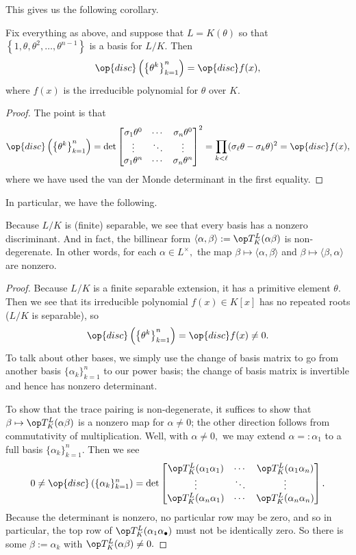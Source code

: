 This gives us the following corollary.
\begin{cor}
    Fix everything as above, and suppose that $L=K(\theta)$ so that $\left\{1,\theta,\theta^2,\ldots,\theta^{n-1}\right\}$ is a basis for $L/K.$ Then
    \[\op{disc}\left(\left\{\theta^k\right\}_{k=1}^n\right)=\op{disc}f(x),\]
    where $f(x)$ is the irreducible polynomial for $\theta$ over $K.$
\end{cor}
\begin{proof}
    The point is that
    \[\op{disc}\left(\left\{\theta^k\right\}_{k=1}^n\right)=\det\begin{bmatrix}
        \sigma_1\theta^0 & \cdots & \sigma_n\theta^0 \\
        \vdots & \ddots & \vdots \\
        \sigma_1\theta^n & \cdots & \sigma_n\theta^n
    \end{bmatrix}^2=\prod_{k<\ell}(\sigma_\ell\theta-\sigma_k\theta)^2=\op{disc}f(x),\]
    where we have used the van der Monde determinant in the first equality.
\end{proof}
In particular, we have the following.
\begin{thm}
    Because $L/K$ is (finite) separable, we see that every basis has a nonzero discriminant. And in fact, the billinear form $\langle\alpha,\beta\rangle:=\op T_K^L(\alpha\beta)$ is non-degerenate. In other words, for each $\alpha\in L^\times,$ the map $\beta\mapsto\langle\alpha,\beta\rangle$ and $\beta\mapsto\langle\beta,\alpha\rangle$ are nonzero.
\end{thm}
\begin{proof}
    Because $L/K$ is a finite separable extension, it has a primitive element $\theta.$ Then we see that its irreducible polynomial $f(x)\in K[x]$ has no repeated roots ($L/K$ is separable), so
    \[\op{disc}\left(\left\{\theta^k\right\}_{k=1}^n\right)=\op{disc}f(x)\ne0.\]
    To talk about other bases, we simply use the change of basis matrix to go from another basis $\{\alpha_k\}_{k=1}^n$ to our power basis; the change of basis matrix is invertible and hence has nonzero determinant.
    
    To show that the trace pairing is non-degenerate, it suffices to show that $\beta\mapsto\op T_K^L(\alpha\beta)$ is a nonzero map for $\alpha\ne0$; the other direction follows from commutativity of multiplication. Well, with $\alpha\ne0,$ we may extend $\alpha=:\alpha_1$ to a full basis $\{\alpha_k\}_{k=1}^n.$ Then we see
    \[0\ne\op{disc}\left(\{\alpha_k\}_{k=1}^n\right)=\det\begin{bmatrix}
        \op T_K^L(\alpha_1\alpha_1) & \cdots & \op T_K^L(\alpha_1\alpha_n) \\
        \vdots & \ddots & \vdots \\
        \op T_K^L(\alpha_n\alpha_1) & \cdots & \op T_K^L(\alpha_n\alpha_n)
    \end{bmatrix}.\]
    Because the determinant is nonzero, no particular row may be zero, and so in particular, the top row of $\op T_K^L(\alpha_1\alpha_\bullet)$ must not be identically zero. So there is some $\beta:=\alpha_k$ with $\op T_K^L(\alpha\beta)\ne0.$
\end{proof}